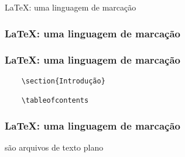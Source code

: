 \begin{frame}[standout]
  \Huge
  \LaTeX: uma linguagem de marcação
\end{frame}

\begin{frame}
  \frametitle{\LaTeX: uma linguagem de marcação}
\end{frame}

\begin{frame}[fragile]
  \frametitle{\LaTeX: uma linguagem de marcação}
  \begin{verbatim}
    \section{Introdução}

    \tableofcontents
  \end{verbatim}
\end{frame}

\begin{frame}
  \frametitle{\LaTeX: uma linguagem de marcação}
  \Huge
   são arquivos de texto plano
\end{frame}
